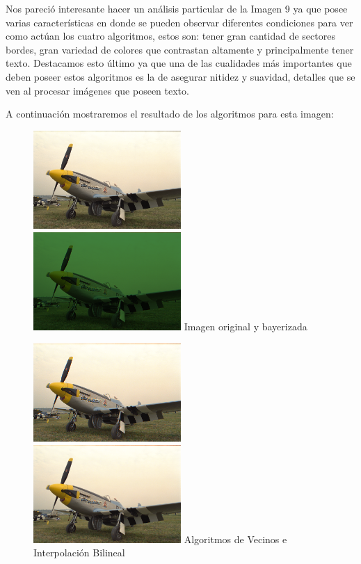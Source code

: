 {Nos pareció interesante hacer un análisis particular de la Imagen 9 ya que posee varias características en donde se pueden observar diferentes condiciones para ver como actúan los cuatro algoritmos, estos son: tener gran cantidad de sectores bordes, gran variedad de colores que contrastan altamente y principalmente tener texto. Destacamos esto último ya que una de las cualidades más importantes que deben poseer estos algoritmos es la de asegurar nitidez y suavidad, detalles que se ven al procesar imágenes que poseen texto. 


A continuación mostraremos el resultado de los algoritmos para esta imagen:

\begin{figure}
       \includegraphics[width=0.5\textwidth]{imagenes/img9.png}
           \hfill
        \includegraphics[width=0.5\textwidth]{imagenes/img9_bayer.png}   
        Imagen original y bayerizada
\end{figure}

\begin{figure}
       \includegraphics[width=0.5\textwidth]{imagenes/img9_demosicing_vecino.png}
           \hfill
        \includegraphics[width=0.5\textwidth]{imagenes/img9_demosicing_bilineal.png}
        Algoritmos de Vecinos e Interpolación Bilineal
\end{figure}


}
